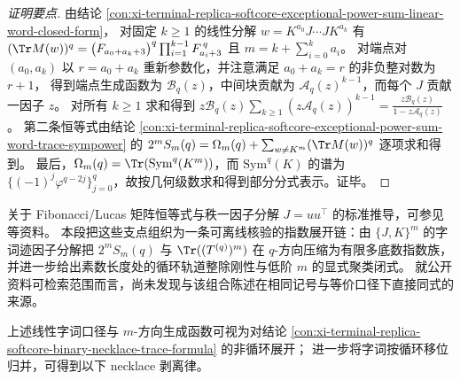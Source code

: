 \begin{proof}[证明要点]
由结论 \ref{con:xi-terminal-replica-softcore-exceptional-power-sum-linear-word-closed-form}，
对固定 \(k\ge 1\) 的线性分解 \(w=K^{a_0}J\cdots JK^{a_k}\) 有
\(
(\Tr M(w))^q=\bigl(F_{a_0+a_k+3}\bigr)^q\prod_{i=1}^{k-1}F_{a_i+3}^{\,q}
\)
且 \(m=k+\sum_{i=0}^{k}a_i\)。
对端点对 \((a_0,a_k)\) 以 \(r=a_0+a_k\) 重新参数化，并注意满足 \(a_0+a_k=r\) 的非负整对数为 \(r+1\)，
得到端点生成函数为 \(\mathscr B_q(z)\)，中间块贡献为 \(\mathscr A_q(z)^{k-1}\)，而每个 \(J\) 贡献一因子 \(z\)。
对所有 \(k\ge 1\) 求和得到
\(
z\mathscr B_q(z)\sum_{k\ge 1}(z\mathscr A_q(z))^{k-1}=\frac{z\mathscr B_q(z)}{1-z\mathscr A_q(z)}
\)。
第二条恒等式由结论 \ref{con:xi-terminal-replica-softcore-exceptional-power-sum-word-trace-sympower} 的
\(2^mS_m(q)=\Omega_m(q)+\sum_{w\neq K^m}(\Tr M(w))^q\) 逐项求和得到。
最后，\(\Omega_m(q)=\Tr(\mathrm{Sym}^q(K^m))\)，而 \(\mathrm{Sym}^q(K)\) 的谱为
\(\{(-1)^j\varphi^{q-2j}\}_{j=0}^{q}\)，故按几何级数求和得到部分分式表示。证毕。
\end{proof}
\begin{remark}[文献对照]\label{rem:xi-terminal-replica-softcore-word-trace-literature-contrast}
关于 Fibonacci/Lucas 矩阵恒等式与秩一因子分解 \(J=uu^{\top}\) 的标准推导，可参见 \cite{FQFibonacciLucasChap11Matrices,MSEFibonacciMatrices784710} 等资料。
本段把这些支点组织为一条可离线核验的指数展开链：由 \(\{J,K\}^m\) 的字词迹因子分解把 \(2^mS_m(q)\) 与 \(\Tr((T^{(q)})^m)\) 在 \(q\)-方向压缩为有限多底数指数族，并进一步给出素数长度处的循环轨道整除刚性与低阶 \(m\) 的显式聚类闭式。
就公开资料可检索范围而言，尚未发现与该组合陈述在相同记号与等价口径下直接同式的来源。
\end{remark}
上述线性字词口径与 \(m\)-方向生成函数可视为对结论 \ref{con:xi-terminal-replica-softcore-binary-necklace-trace-formula} 的非循环展开；
进一步将字词按循环移位归并，可得到以下 necklace 剥离律。
\endinput
